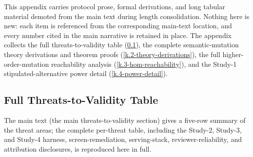 \documentclass[manuscript,screen,review]{acmart}
\begin{document}
This appendix carries protocol prose, formal derivations, and long tabular
material demoted from the main text during length consolidation. Nothing here
is new: each item is referenced from the corresponding main-text location, and
every number cited in the main narrative is retained in place. The appendix
collects the full threats-to-validity table (\ref{k.1-full-threats-table}),
the complete semantic-mutation theory derivations and theorem proofs
(\ref{k.2-theory-derivations}), the full higher-order-mutation reachability
analysis (\ref{k.3-hom-reachability}), and the Study-1 stipulated-alternative
power detail (\ref{k.4-power-detail}).

\subsection{Full Threats-to-Validity Table}\label{k.1-full-threats-table}

The main text (the main threats-to-validity section) gives a five-row summary of
the threat areas; the complete per-threat table, including the Study-2, Study-3,
and Study-4 harness, screen-remediation, serving-stack, reviewer-reliability,
and attribution disclosures, is reproduced here in full.
\end{document}
